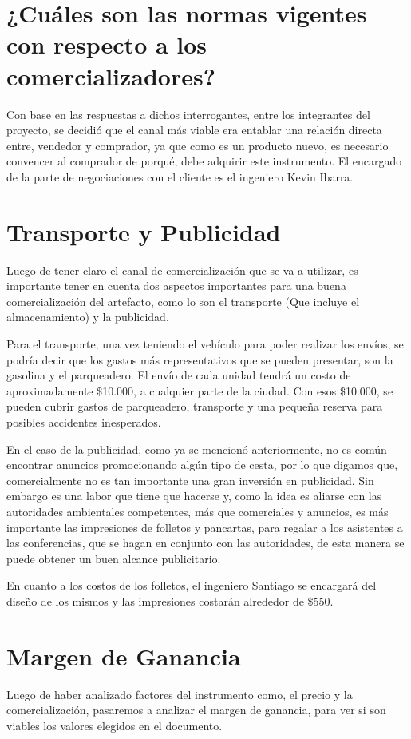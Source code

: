 \documentclass[letterpaper,12pt]{scrreprt}
\begin{document}
    \section{¿Cuáles son las normas vigentes con respecto a los comercializadores?}

    Con base en las respuestas a dichos interrogantes, entre los integrantes del proyecto, se decidió que el canal más viable era entablar una relación directa entre, vendedor y comprador, ya que como es un producto nuevo, es necesario convencer al comprador de porqué, debe adquirir este instrumento. El encargado de la parte de negociaciones con el cliente es el ingeniero Kevin Ibarra.

    \section{Transporte y Publicidad}
    Luego de tener claro el canal de comercialización que se va a utilizar, es importante tener en cuenta dos aspectos importantes para una buena comercialización del artefacto, como lo son el transporte (Que incluye el almacenamiento) y la publicidad.

    Para el transporte, una vez teniendo el vehículo para poder realizar los envíos, se podría decir que los gastos más representativos que se pueden presentar, son la gasolina y el parqueadero. El envío de cada unidad tendrá un costo de aproximadamente \$10.000, a cualquier parte de la ciudad. Con esos \$10.000, se pueden cubrir gastos de parqueadero, transporte y una pequeña reserva para posibles accidentes inesperados.

    En el caso de la publicidad, como ya se mencionó anteriormente, no es común encontrar anuncios promocionando algún tipo de cesta, por lo que digamos que, comercialmente no es tan importante una gran inversión en publicidad. Sin embargo es una labor que tiene que hacerse y, como la idea es aliarse con las autoridades ambientales competentes, más que comerciales  y anuncios, es más importante las impresiones de folletos y pancartas, para regalar a los asistentes a las conferencias, que se hagan en conjunto con las autoridades, de esta manera se puede obtener un buen alcance publicitario.

    En cuanto a los costos de los folletos, el ingeniero Santiago se encargará del diseño de los mismos y las impresiones costarán alrededor de \$550.

    \section{Margen de Ganancia}
    Luego de haber analizado factores del instrumento como, el precio y la comercialización, pasaremos a analizar el margen de ganancia, para ver si son viables los valores elegidos en el documento.
\end{document}
